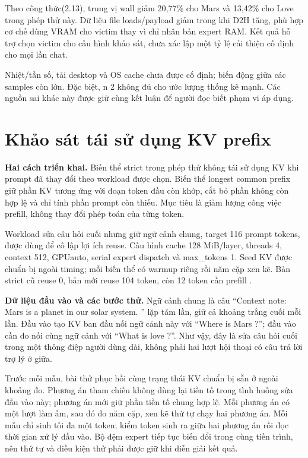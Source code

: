 Theo công thức(2.13), trung vị wall giảm 20,77\% cho Mars và 13,42\% cho Love trong phép thử này. Dữ liệu file loads/payload giảm trong khi D2H tăng, phù hợp cơ chế dùng VRAM cho victim thay vì chỉ nhân bản expert RAM. Kết quả hỗ trợ chọn victim cho cấu hình khảo sát, chưa xác lập một tỷ lệ cải thiện cố định cho mọi lần chat.

Nhiệt/tần số, tải desktop và OS cache chưa được cố định; biến động giữa các samples còn lớn. Đặc biệt, n 2 không đủ cho ước lượng thống kê mạnh. Các nguồn sai khác này được giữ cùng kết luận để người đọc biết phạm vi áp dụng.

\section{Khảo sát tái sử dụng KV prefix}

\textbf{Hai cách triển khai.} Biến thể strict trong phép thử không tái sử dụng KV khi prompt đã thay đổi theo workload được chọn. Biến thể longest common prefix giữ phần KV tương ứng với đoạn token đầu còn khớp, cắt bỏ phần không còn hợp lệ và chỉ tính phần prompt còn thiếu. Mục tiêu là giảm lượng công việc prefill, không thay đổi phép toán của từng token.

Workload sửa câu hỏi cuối nhưng giữ ngữ cảnh chung, target 116 prompt tokens, được dùng để cô lập lợi ích reuse. Cấu hình cache 128 MiB/layer, threads 4, context 512, GPUauto, serial expert dispatch và max\_tokens 1. Seed KV được chuẩn bị ngoài timing; mỗi biến thể có warmup riêng rồi năm cặp xen kẽ. Bản strict cũ reuse 0, bản mới reuse 104 token, còn 12 token cần prefill \cite{exp_prefill_i5}.

\textbf{Dữ liệu đầu vào và các bước thử.} Ngữ cảnh chung là câu “Context note: Mars is a planet in our solar system. ” lặp tám lần, giữ cả khoảng trắng cuối mỗi lần. Đầu vào tạo KV ban đầu nối ngữ cảnh này với “Where is Mars ?”; đầu vào cần đo nối cùng ngữ cảnh với “What is love ?”. Như vậy, đây là sửa câu hỏi cuối trong một thông điệp người dùng dài, không phải hai lượt hội thoại có câu trả lời trợ lý ở giữa.

Trước mỗi mẫu, bài thử phục hồi cùng trạng thái KV chuẩn bị sẵn ở ngoài khoảng đo. Phương án tham chiếu không dùng lại tiền tố trong tình huống sửa đầu vào này; phương án mới giữ phần tiền tố chung hợp lệ. Mỗi phương án có một lượt làm ấm, sau đó đo năm cặp, xen kẽ thứ tự chạy hai phương án. Mỗi mẫu chỉ sinh tối đa một token; kiểm token sinh ra giữa hai phương án rồi đọc thời gian xử lý đầu vào. Bộ đệm expert tiếp tục biến đổi trong cùng tiến trình, nên thứ tự và điều kiện thử phải được giữ khi diễn giải kết quả.

